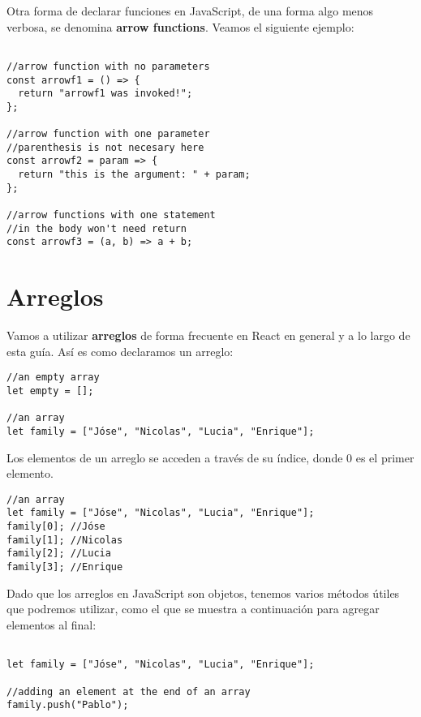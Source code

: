 \documentclass[a4paper, oneside, titlepage, 12pt]{paper}
\begin{document}
Otra forma de declarar funciones en JavaScript, de una forma algo menos verbosa, se denomina \textbf{arrow functions}. Veamos el siguiente ejemplo:

\begin{verbatim}
               
//arrow function with no parameters
const arrowf1 = () => {
  return "arrowf1 was invoked!";
};

//arrow function with one parameter
//parenthesis is not necesary here
const arrowf2 = param => {
  return "this is the argument: " + param;
};

//arrow functions with one statement 
//in the body won't need return 
const arrowf3 = (a, b) => a + b;
\end{verbatim}

\section{Arreglos} \label{arrays}

Vamos a utilizar \textbf{arreglos} de forma frecuente en React en general y a lo largo de esta guía. Así es como declaramos un arreglo:

\begin{verbatim}
//an empty array
let empty = [];

//an array
let family = ["Jóse", "Nicolas", "Lucia", "Enrique"];
\end{verbatim}

Los elementos de un arreglo se acceden a través de su índice, donde 0 es el primer elemento.

\begin{verbatim}
//an array
let family = ["Jóse", "Nicolas", "Lucia", "Enrique"];
family[0]; //Jóse
family[1]; //Nicolas
family[2]; //Lucia
family[3]; //Enrique
\end{verbatim}

Dado que los arreglos en JavaScript son objetos, tenemos varios métodos útiles que podremos utilizar, como el que se muestra a continuación para agregar elementos al final:

\begin{verbatim}

let family = ["Jóse", "Nicolas", "Lucia", "Enrique"];

//adding an element at the end of an array
family.push("Pablo");
\end{verbatim}
\end{document}
